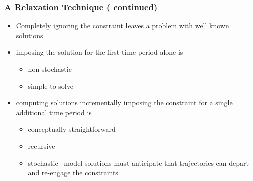 \documentclass{beamer}
\begin{document}
   \begin{frame}
     \frametitle{A Relaxation Technique ( continued)}
     
     \begin{itemize}
     	\item Completely ignoring the constraint leaves a problem with well known solutions\citep{anderson10,simssolving}
      \item imposing the solution for the first time period alone is 
      \begin{itemize}
      	\item non stochastic
      	\item simple to solve
      \end{itemize}
      \item computing solutions incrementally imposing the constraint for a single additional time period is
      \begin{itemize}
      	\item conceptually straightforward 
      	\item recursive 
      	\item stochastic-- model solutions must anticipate that trajectories can depart and re-engage the constraints  
      \end{itemize}
     \end{itemize}
   \end{frame}
\end{document}
